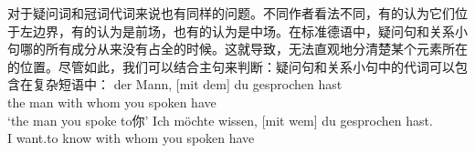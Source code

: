 对于疑问词和冠词代词来说也有同样的问题。不同作者看法不同，有的认为它们位于左边界，有的认为是前场，也有的认为是中场。在标准德语中，疑问句和关系小句哪的所有成分从来没有占全的时候。这就导致，无法直观地分清楚某个元素所在的位置。尽管如此，我们可以结合主句来判断：疑问句和关系小句中的代词可以包含在复杂短语中：
\eal
\ex 
\gll der Mann,         [mit dem] du gesprochen hast\\
     the man \spacebr{}with whom you spoken have\\
\glt `the man you spoke to你'	 
\ex 
\gll Ich möchte wissen, [mit wem] du gesprochen hast.\\
     I want.to know \spacebr{}with whom you spoken have\\
